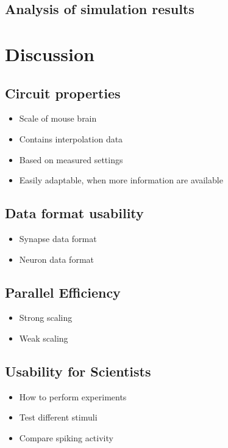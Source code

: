 \documentclass[a4paper]{article}
\begin{document}
\subsection{Analysis of simulation results}


\section{Discussion}
\subsection{Circuit properties}
\begin{itemize}
      \item Scale of mouse brain
      \item Contains interpolation data
      \item Based on measured settings
      \item Easily adaptable, when more information are available
\end{itemize}
\subsection{Data format usability}
\begin{itemize}
      \item Synapse data format
      \item Neuron data format
\end{itemize}

\subsection{Parallel Efficiency}
\begin{itemize}
      \item Strong scaling
      \item Weak scaling
\end{itemize}
\subsection{Usability for Scientists}
\begin{itemize}
      \item How to perform experiments
      \item Test different stimuli 
      \item Compare spiking activity
\end{itemize}
\end{document}
